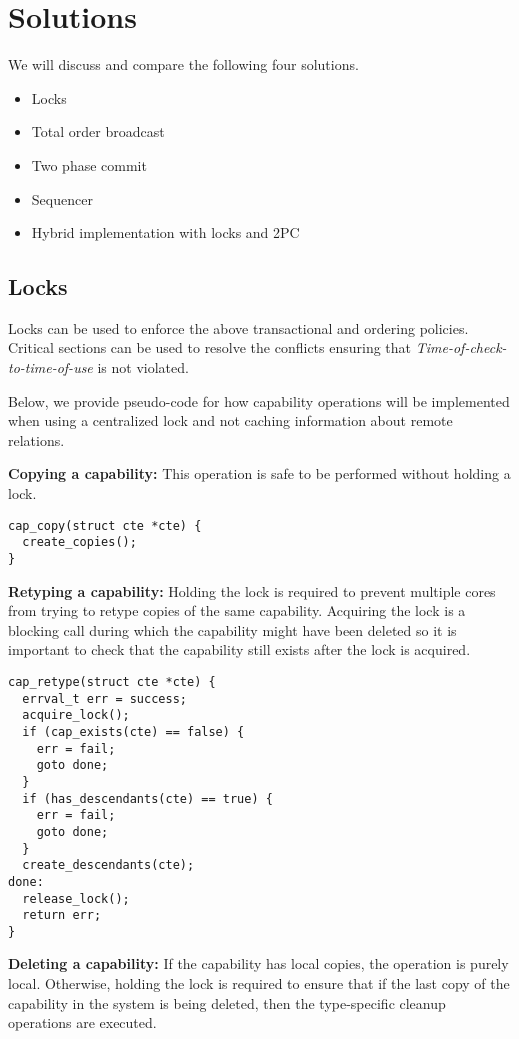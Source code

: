 \documentclass[a4paper,twoside]{report} %
\begin{document}
\section{Solutions}\label{sec:solutions}

We will discuss and compare the following four solutions.

\begin{itemize}
\item Locks
\item Total order broadcast
\item Two phase commit
\item Sequencer
\item Hybrid implementation with locks and 2PC
\end{itemize}

\subsection{Locks}\label{subsec:locks}
Locks can be used to enforce the above transactional and ordering
policies. Critical sections can be used to resolve the conflicts
ensuring that \emph{Time-of-check-to-time-of-use} is not violated.

Below, we provide pseudo-code for how capability operations will be
implemented when using a centralized lock and not caching information
about remote relations.

\textbf{Copying a capability:} This operation is safe to be performed
without holding a lock.

\begin{verbatim}
cap_copy(struct cte *cte) {
  create_copies();
}
\end{verbatim}

\textbf{Retyping a capability:} Holding the lock is required to
prevent multiple cores from trying to retype copies of the same
capability. Acquiring the lock is a blocking call during which the
capability might have been deleted so it is important to check that
the capability still exists after the lock is acquired.

\begin{verbatim}
cap_retype(struct cte *cte) {
  errval_t err = success;
  acquire_lock();
  if (cap_exists(cte) == false) {
    err = fail;
    goto done;
  }
  if (has_descendants(cte) == true) {
    err = fail;
    goto done;
  }
  create_descendants(cte);
done:
  release_lock();
  return err;
}
\end{verbatim}

\textbf{Deleting a capability:} If the capability has local copies,
the operation is purely local. Otherwise, holding the lock is required
to ensure that if the last copy of the capability in the system is
being deleted, then the type-specific cleanup operations are executed.
\end{document}
